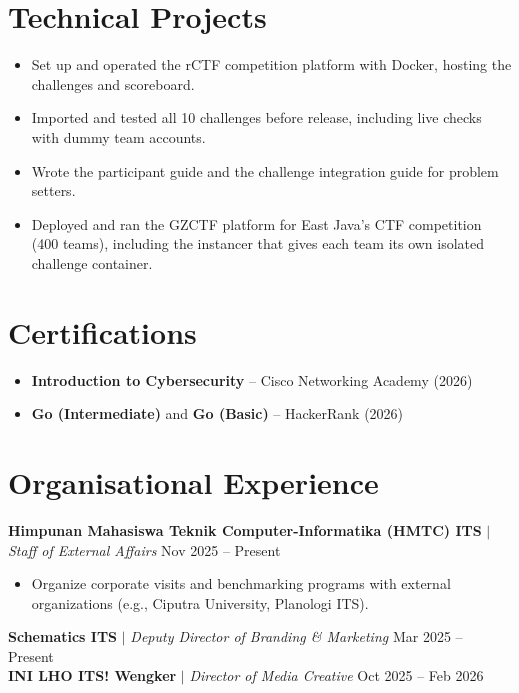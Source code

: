 \section{Technical Projects}

\begin{itemize}
    \item Set up and operated the rCTF competition platform with Docker, hosting the challenges and scoreboard.
    \item Imported and tested all 10 challenges before release, including live checks with dummy team accounts.
    \item Wrote the participant guide and the challenge integration guide for problem setters.
\end{itemize}

\vspace{2pt}

\begin{itemize}
    \item Deployed and ran the GZCTF platform for East Java's CTF competition (400 teams), including the instancer that gives each team its own isolated challenge container.
\end{itemize}

\section{Certifications}

\begin{itemize}
    \item \textbf{Introduction to Cybersecurity} -- Cisco Networking Academy (2026)
    \item \textbf{Go (Intermediate)} and \textbf{Go (Basic)} -- HackerRank (2026)
\end{itemize}

\section{Organisational Experience}

\textbf{Himpunan Mahasiswa Teknik Computer-Informatika (HMTC) ITS} $|$ \textit{Staff of External Affairs} \hfill Nov 2025 -- Present
\begin{itemize}
    \item Organize corporate visits and benchmarking programs with external organizations (e.g., Ciputra University, Planologi ITS).
\end{itemize}

\vspace{2pt}

\textbf{Schematics ITS} $|$ \textit{Deputy Director of Branding \& Marketing} \hfill Mar 2025 -- Present \\
\textbf{INI LHO ITS! Wengker} $|$ \textit{Director of Media Creative} \hfill Oct 2025 -- Feb 2026


